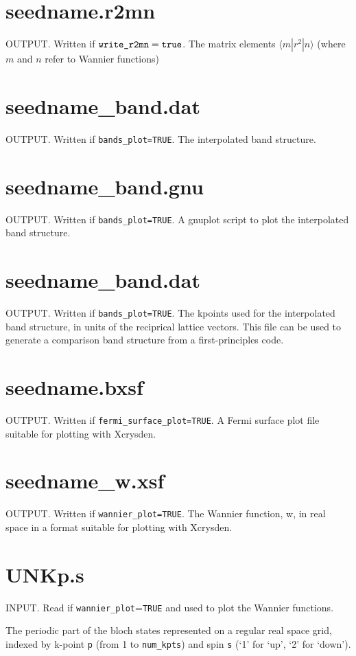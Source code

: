 \section{seedname.r2mn}
OUTPUT.
Written if $\verb#write_r2mn#=\verb#true#$. The matrix elements
$\langle m|r^2|n\rangle$ (where $m$ and $n$ refer to Wannier functions)

\section{seedname\_band.dat}
OUTPUT. Written if {\tt bands\_plot=TRUE}. The interpolated band structure.

\section{seedname\_band.gnu}
OUTPUT. Written if {\tt bands\_plot=TRUE}. A gnuplot script to plot the interpolated band structure.

\section{seedname\_band.dat}
OUTPUT. Written if {\tt bands\_plot=TRUE}. The kpoints used for the interpolated band structure, in units
of the reciprical lattice vectors. This file can be used to generate
a comparison band structure from a first-principles code.

\section{seedname.bxsf}
OUTPUT. Written if {\tt fermi\_surface\_plot=TRUE}. A Fermi surface plot file
suitable for plotting with Xcrysden.

\section{seedname\_w.xsf}
OUTPUT. Written if {\tt wannier\_plot=TRUE}. The Wannier function, w,  in real space 
in a format suitable for plotting with Xcrysden.


\section{UNKp.s}
INPUT. Read if \verb#wannier_plot#=\verb#TRUE# and used to plot the
Wannier functions.

The periodic part of the bloch states represented on a regular real
 space grid, indexed by k-point \verb#p# (from 1 to \verb#num_kpts#)
 and spin \verb#s# (`1' for `up', `2' for `down').

